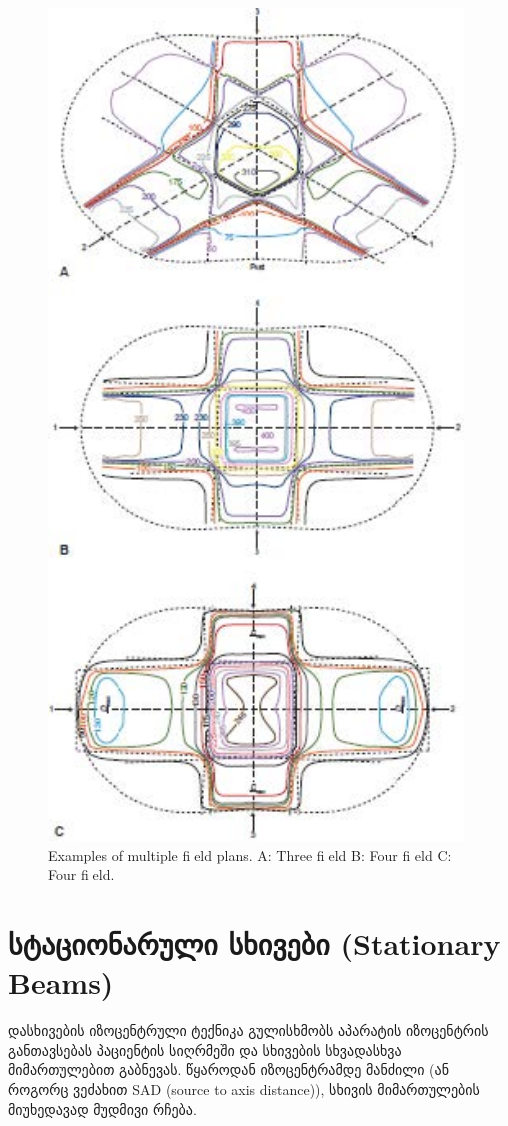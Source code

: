 \documentclass[12pt,a4paper,]{report}
\begin{document}
	\begin{figure}[!h]
	    \centering
        \includegraphics[width = 11cm]{images/multiple_fields_02}
        \caption{Examples of multiple field plans. A: Three field B: Four fi eld C: Four field.}
    \end{figure}

\section{სტაციონარული სხივები (Stationary Beams)}
დასხივების იზოცენტრული ტექნიკა გულისხმობს აპარატის იზოცენტრის განთავსებას პაციენტის სიღრმეში და სხივების სხვადასხვა მიმართულებით გაბნევას. წყაროდან იზოცენტრამდე მანძილი (ან როგორც ვეძახით SAD (source to axis distance)), სხივის მიმართულების მიუხედავად მუდმივი რჩება.
\end{document}
